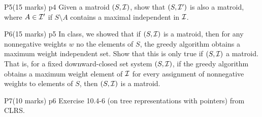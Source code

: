 \documentclass[a4paper, 11pt]{article}
\begin{document}

\begin{problem}{%
		P5\hfill  (15 marks)
	}{p4%
	}
Given a matroid $(S,\mathcal{I})$, show that  $(S,\mathcal{I}')$ is also a matroid, where $A\in \mathcal{I}'$ if $S\setminus A$ contains a maximal independent in $\mathcal{I}$.
\end{problem}
\solve{

}



\begin{problem}{%
	P6\hfill  (15 marks)
}{p5%
}
In class, we showed that if $(S,\mathcal{I})$ is a matroid, then for any nonnegative weights $w$ no the  elements of $S$, the greedy algorithm obtains a maximum weight independent set. Show that this is only true if $(S,\mathcal{I})$ a matroid. That is, for a fixed downward-closed set system $(S,\mathcal{I})$, if the greedy algorithm obtains a maximum weight element of $\mathcal{I}$ for every assignment of nonnegative weights to elements of $S$, then $(S,\mathcal{I})$ is a matroid.
\end{problem}
\solve{ 
}



\begin{problem}{%
	P7\hfill  (10 marks)
}{p6%
}
Exercise 10.4-6 (on tree representations with pointers) from CLRS.

\end{problem}
\solve{
}


\end{document}
